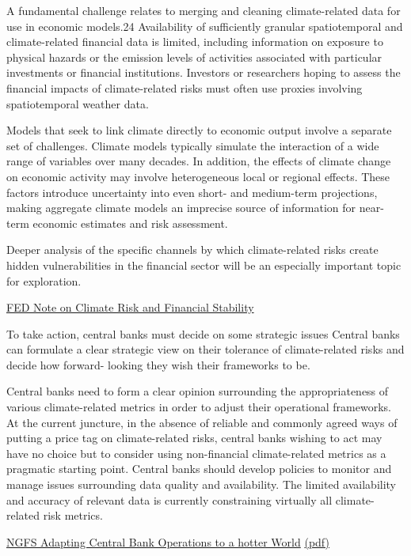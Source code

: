\documentclass[
]{book}
\begin{document}
A fundamental challenge relates to merging and cleaning climate-related data for use in economic models.24 Availability of sufficiently granular spatiotemporal and climate-related financial data is limited, including information on exposure to physical hazards or the emission levels of activities associated with particular investments or financial institutions. Investors or researchers hoping to assess the financial impacts of climate-related risks must often use proxies involving spatiotemporal weather data.

Models that seek to link climate directly to economic output involve a separate set of challenges. Climate models typically simulate the interaction of a wide range of variables over many decades. In addition, the effects of climate change on economic activity may involve heterogeneous local or regional effects. These factors introduce uncertainty into even short- and medium-term projections, making aggregate climate models an imprecise source of information for near-term economic estimates and risk assessment.

Deeper analysis of the specific channels by which climate-related risks create hidden vulnerabilities in the financial sector will be an especially important topic for exploration.

\href{https://www.federalreserve.gov/econres/notes/feds-notes/climate-change-and-financial-stability-20210319.htm}{FED Note on Climate Risk and Financial Stability}

To take action, central banks must decide
on some strategic issues
Central banks can formulate a clear strategic view on their
tolerance of climate-related risks and decide how forward-
looking they wish their frameworks to be.

Central banks need to form a clear opinion surrounding
the appropriateness of various climate-related metrics in
order to adjust their operational frameworks. At the current
juncture, in the absence of reliable and commonly agreed
ways of putting a price tag on climate-related risks, central
banks wishing to act may have no choice but to consider
using non-financial climate-related metrics as a pragmatic
starting point.
Central banks should develop policies to monitor and
manage issues surrounding data quality and availability.
The limited availability and accuracy of relevant data is
currently constraining virtually all climate-related risk
metrics.

\href{https://www.ngfs.net/en/adapting-central-bank-operations-hotter-world-reviewing-some-options}{NGFS Adapting Central Bank Operations to a hotter World}
\href{pdf/ngfs_2021_monetary_policy_operations.pdf}{(pdf)}
\end{document}

